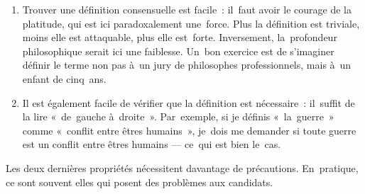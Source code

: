 \documentclass[a4paper,12pt]{report}
\begin{document}
\begin{enumerate}
\item Trouver une définition consensuelle est facile : il faut avoir le
courage de la platitude, qui est ici paradoxalement une force. Plus
la définition est triviale, moins elle est attaquable, plus elle
est forte. Inversement, la profondeur philosophique serait ici une
faiblesse. Un bon exercice est de s'imaginer définir le terme non pas
à un jury de philosophes professionnels, mais à un enfant de
cinq ans.

\item Il est également facile de vérifier que la définition est
nécessaire : il suffit de la lire « de gauche à droite ».
Par exemple, si je définis « la guerre » comme « conflit entre êtres
humains », je dois me demander si toute guerre est un conflit entre
êtres humains --- ce qui est bien le cas.
\end{enumerate}

Les deux dernières propriétés nécessitent davantage de précautions.
En pratique, ce sont souvent elles qui posent des problèmes aux
candidats. 
\end{document}
